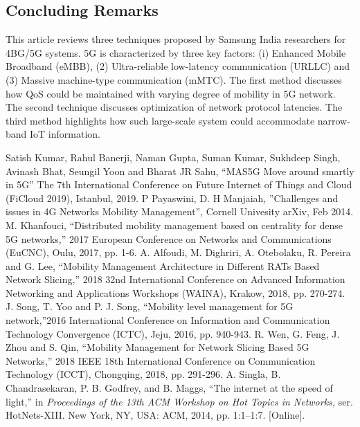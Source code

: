 \begin{multicols}{2}
\section{Concluding Remarks}

This article reviews three techniques proposed by Samsung India researchers for 4BG/5G systems. 5G is characterized by three key factors: (i) Enhanced Mobile Broadband (eMBB), (2) Ultra-reliable low-latency communication (URLLC) and (3) Massive machine-type communication (mMTC). The first method discusses how QoS could be maintained with varying degree of mobility in 5G network. The second technique discusses optimization of network protocol latencies. The third method highlights how such large-scale system could accommodate narrow-band IoT information. 


{\fontsize{9pt}{10.5pt}\selectfont

\begin{thebibliography}{99}
 Satish Kumar, Rahul Banerji, Naman Gupta, Suman Kumar, Sukhdeep Singh, Avinash Bhat, Seungil Yoon and Bharat JR Sahu, “MAS5G Move around smartly in 5G” The 7th International Conference on Future Internet of Things and Cloud (FiCloud 2019), Istanbul, 2019.
 P Payaswini, D. H Manjaiah, ”Challenges and issues in 4G Networks Mobility Management”, Cornell Univesity arXiv, Feb 2014.
 M. Khanfouci, ``Distributed mobility management based on centrality for dense 5G networks,” 2017 European Conference on Networks and Communications (EuCNC), Oulu, 2017, pp. 1-6.
 A. Alfoudi, M. Dighriri, A. Otebolaku, R. Pereira and G. Lee, ``Mobility Management Architecture in Different RATs Based Network Slicing,” 2018 32nd International Conference on Advanced Information Networking and Applications Workshops (WAINA), Krakow, 2018, pp. 270-274.
 J. Song, T. Yoo and P. J. Song, ``Mobility level management for 5G network,”2016 International Conference on Information and Communication Technology Convergence (ICTC), Jeju, 2016, pp. 940-943.
 R. Wen, G. Feng, J. Zhou and S. Qin, ``Mobility Management for Network Slicing Based 5G Networks,” 2018 IEEE 18th International Conference on Communication Technology (ICCT), Chongqing, 2018, pp. 291-296.
 A. Singla, B. Chandrasekaran, P. B. Godfrey, and B. Maggs, ``The internet at the speed of light,” in \textit{Proceedings of the 13th ACM Workshop on Hot Topics in Networks,} ser. HotNets-XIII. New York, NY, USA: ACM, 2014, pp. 1:1–1:7. [Online].


\end{thebibliography}}
\end{multicols}
